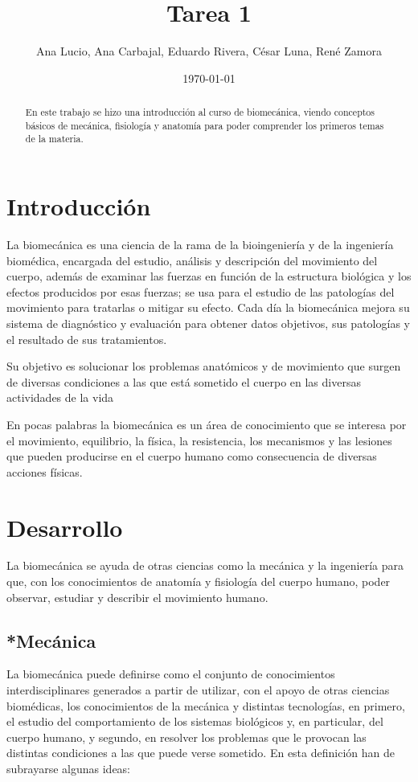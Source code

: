 \documentclass{article}
\author{Ana Lucio,
Ana Carbajal,
Eduardo Rivera,
César Luna,
René Zamora} %
\title{Tarea 1} %
\date{\today}
\begin{document}

\maketitle %

\begin{abstract} %
En este trabajo se hizo una introducción al curso de biomecánica, viendo conceptos básicos de mecánica, fisiología y anatomía para poder comprender los primeros temas de la materia.
\end{abstract}

\section{Introducción}\label{intro} %
La biomecánica es una ciencia de la rama de la bioingeniería y de la ingeniería biomédica, encargada del estudio, análisis y descripción del movimiento del cuerpo, además de examinar las fuerzas en función de la estructura biológica y los efectos producidos por esas fuerzas;  se usa para el estudio de las patologías del movimiento para tratarlas o mitigar su efecto. Cada día la biomecánica mejora su sistema de diagnóstico y evaluación para obtener datos objetivos, sus patologías y el resultado de sus tratamientos.

Su objetivo es solucionar los problemas anatómicos y de movimiento que surgen de diversas condiciones a las que está sometido el cuerpo en las diversas actividades de la vida

En pocas palabras la biomecánica es un área de conocimiento que se interesa por el movimiento, equilibrio, la física, la resistencia, los mecanismos y las lesiones que pueden producirse en el cuerpo humano como consecuencia de diversas acciones físicas.

\section{Desarrollo}


La biomecánica se ayuda de otras ciencias como la mecánica y la ingeniería para que, con los conocimientos de anatomía y fisiología del cuerpo humano, poder observar, estudiar y describir el movimiento humano. 

\subsection{\textbf{*Mecánica}}
La biomecánica puede definirse como el conjunto de conocimientos interdisciplinares generados a partir de utilizar, con el apoyo de otras ciencias biomédicas, los conocimientos de la mecánica y distintas tecnologías, en primero, el estudio del comportamiento de los sistemas biológicos y, en particular, del cuerpo humano, y segundo, en resolver los problemas que le provocan las distintas condiciones a las que puede verse sometido.
En esta definición han de subrayarse algunas ideas: 
\end{document}
